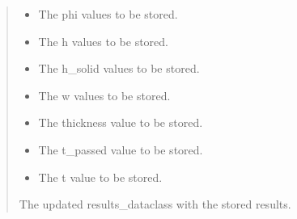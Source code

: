 \documentclass[a4paper,11pt,english,openany]{sphinxmanual}
\begin{document}
\begin{fulllineitems}
\begin{fulllineitems}
\begin{quote}
\begin{description}
\begin{itemize}
\item {} 
\sphinxAtStartPar
{} \textendash{} The phi values to be stored.

\item {} 
\sphinxAtStartPar
{} \textendash{} The h values to be stored.

\item {} 
\sphinxAtStartPar
{} \textendash{} The h\_solid values to be stored.

\item {} 
\sphinxAtStartPar
{} \textendash{} The w values to be stored.

\item {} 
\sphinxAtStartPar
{} \textendash{} The thickness value to be stored.

\item {} 
\sphinxAtStartPar
{} \textendash{} The t\_passed value to be stored.

\item {} 
\sphinxAtStartPar
{} \textendash{} The t value to be stored.

\end{itemize}

\sphinxAtStartPar
The updated results\_dataclass with the stored results.

\end{description}\end{quote}

\end{fulllineitems}



\end{fulllineitems}
\end{document}
